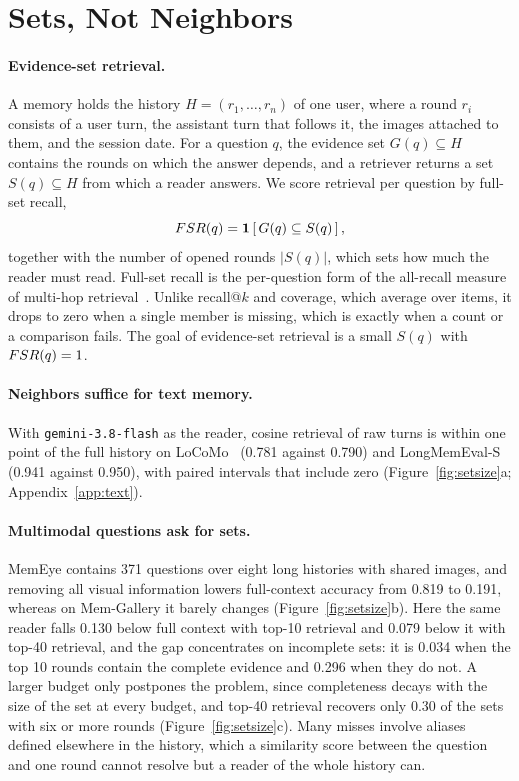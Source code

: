 \section{Sets, Not Neighbors}
\label{sec:problem}

\paragraph{Evidence-set retrieval.} A memory holds the history $H=(r_1,\dots,r_n)$ of one user, where a round $r_i$ consists of a user turn, the assistant turn that follows it, the images attached to them, and the session date. For a question $q$, the evidence set $G(q)\subseteq H$ contains the rounds on which the answer depends, and a retriever returns a set $S(q)\subseteq H$ from which a reader answers. We score retrieval per question by full-set recall,
\begin{equation}
FSR(q)=\mathbf{1}\left[\,G(q)\subseteq S(q)\,\right],
\label{eq:fsr}
\end{equation}
together with the number of opened rounds $|S(q)|$, which sets how much the reader must read. Full-set recall is the per-question form of the all-recall measure of multi-hop retrieval~\citep{gutierrez2024hipporag}. Unlike recall@$k$ and coverage, which average over items, it drops to zero when a single member is missing, which is exactly when a count or a comparison fails. The goal of evidence-set retrieval is a small $S(q)$ with $FSR(q)=1$.

\paragraph{Neighbors suffice for text memory.} With \texttt{gemini-3.8-flash} as the reader, cosine retrieval of raw turns is within one point of the full history on LoCoMo~\citep{maharana2024locomo} (0.781 against 0.790) and LongMemEval-S~\citep{wu2025longmemeval} (0.941 against 0.950), with paired intervals that include zero (Figure~\ref{fig:setsize}a; Appendix~\ref{app:text}).

\paragraph{Multimodal questions ask for sets.} MemEye contains 371 questions over eight long histories with shared images, and removing all visual information lowers full-context accuracy from 0.819 to 0.191, whereas on Mem-Gallery it barely changes (Figure~\ref{fig:setsize}b). Here the same reader falls 0.130 below full context with top-10 retrieval and 0.079 below it with top-40 retrieval, and the gap concentrates on incomplete sets: it is 0.034 when the top 10 rounds contain the complete evidence and 0.296 when they do not. A larger budget only postpones the problem, since completeness decays with the size of the set at every budget, and top-40 retrieval recovers only 0.30 of the sets with six or more rounds (Figure~\ref{fig:setsize}c). Many misses involve aliases defined elsewhere in the history, which a similarity score between the question and one round cannot resolve but a reader of the whole history can.

